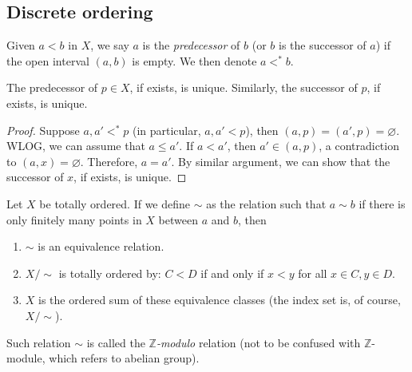 \documentclass{treatise}
\begin{document}
\subsection{Discrete ordering}
Given $a < b$ in $X$, we say $a$ is the \emph{predecessor} of $b$ (or $b$ is the {successor} of $a$) if the open interval $(a, b)$ is empty. We then denote $a <^* b$.
\begin{remark} \label{ord-pred-succ-unique}
The predecessor of $p \in X$, if exists, is unique. Similarly, the successor of $p$, if exists, is unique.
\end{remark}
\begin{proof}
Suppose $a, a' <^* p$ (in particular, $a, a' < p$), then $(a, p) = (a', p) = \varnothing$. WLOG, we can assume that $a \leq a'$. If $a < a'$, then $a' \in (a, p)$, a contradiction to $(a, x) = \varnothing$. Therefore, $a = a'$. By similar argument, we can show that the successor of $x$, if exists, is unique.
\end{proof}
\begin{lemma} \label{ord-z-mod}
Let $X$ be totally ordered. If we define $\sim$ as the relation such that $a \sim b$ if there is only finitely many points in $X$ between $a$ and $b$, then
\begin{enumerate}
    \item $\sim$ is an equivalence relation.
    \item $X / \sim$ is totally ordered by: $C < D$ if and only if $x < y$ for all $x \in C, y \in D$.
    \item $X$ is the ordered sum of these equivalence classes (the index set is, of course, $X / \sim$).
\end{enumerate}
Such relation $\sim$ is called the \emph{$\mathbb{Z}$-modulo} relation (not to be confused with $\mathbb{Z}$-module, which refers to abelian group).
\end{lemma}
\end{document}
